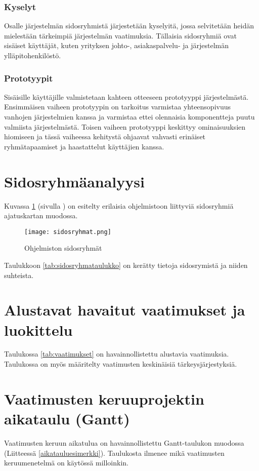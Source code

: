         \subsubsection{Kyselyt}

        Osalle järjestelmän sidosryhmistä järjestetään kyselyitä, jossa selvitetään heidän mielestään tärkeimpiä järjestelmän vaatimuksia.
        Tällaisia sidosryhmiä ovat sisäiset käyttäjät, kuten yrityksen johto-, asiakaspalvelu- ja järjestelmän ylläpitohenkilöstö.

        \subsubsection*{Prototyypit}

        Sisäisille käyttäjille valmistetaan kahteen otteeseen prototyyppi järjestelmästä. Ensimmäisen vaiheen prototyypin on tarkoitus varmistaa yhteensopivuus vanhojen järjestelmien kanssa ja varmistaa ettei olennaisia komponentteja puutu valmiista järjestelmästä. Toisen vaiheen prototyyppi keskittyy ominaisuuksien hiomiseen ja tässä vaiheessa kehitystä ohjaavat vahvasti erinäiset ryhmätapaamiset ja haastattelut käyttäjien kanssa.
	
\section{Sidosryhmäanalyysi}

        Kuvassa \ref{img:sidosryhmat} (sivulla \pageref{img:sidosryhmat}) on esitelty erilaisia ohjelmistoon liittyviä sidosryhmiä ajatuskartan muodossa.

        \begin{figure}[H] %
		\centering
		\texttt{[image: sidosryhmat.png]}
		\caption{Ohjelmiston sidosryhmät} %
		\label{img:sidosryhmat}
	\end{figure}

	Taulukkoon \ref{tab:sidosryhmataulukko} on kerätty tietoja sidosrymistä ja niiden suhteista.

\section{Alustavat havaitut vaatimukset ja luokittelu}
Taulukossa \ref{tab:vaatimukset} on havainnollistettu alustavia vaatimuksia. Taulukossa on myös määritelty vaatimusten keskinäisiä tärkeysjärjestyksiä.

    
\section{Vaatimusten keruuprojektin aikataulu (Gantt)}

	Vaatimusten keruun aikatulua on havainnollistettu Gantt-taulukon muodossa (Liitteessä \ref{aikatauluesimerkki}). Taulukosta ilmenee mikä vaatimusten keruumenetelmä on käytössä milloinkin.


